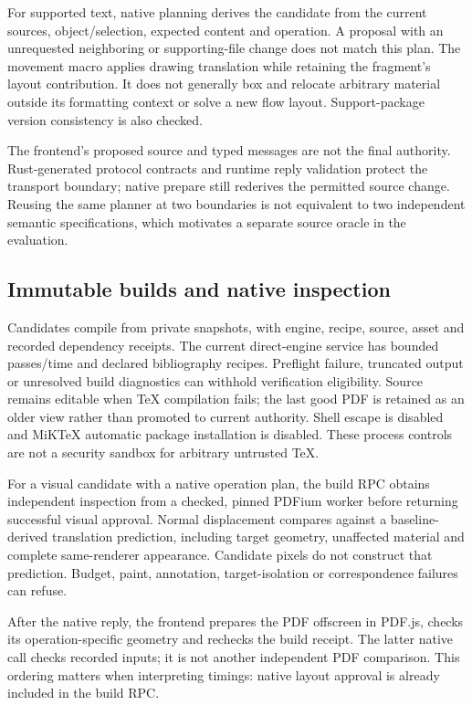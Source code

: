 For supported text, native planning derives the candidate from the current
sources, object/selection, expected content and operation. A proposal with an
unrequested neighboring or supporting-file change does not match this plan.
The movement macro applies drawing translation while retaining the fragment's
layout contribution. It does not generally box and relocate arbitrary material
outside its formatting context or solve a new flow layout. Support-package
version consistency is also checked.

The frontend's proposed source and typed messages are not the final authority.
Rust-generated protocol contracts and runtime reply validation protect the
transport boundary; native prepare still rederives the permitted source
change. Reusing the same planner at two boundaries is not equivalent to two
independent semantic specifications, which motivates a separate source oracle
in the evaluation.

\subsection{Immutable builds and native inspection}
Candidates compile from private snapshots, with engine, recipe, source,
asset and recorded dependency receipts. The current direct-engine service
has bounded passes/time and declared bibliography recipes. Preflight failure,
truncated output or unresolved build diagnostics can withhold verification
eligibility. Source remains editable when TeX compilation fails; the last
good PDF is retained as an older view rather than promoted to current authority.
Shell escape is disabled and MiKTeX automatic package installation is disabled.
These process controls are not a security sandbox for arbitrary untrusted TeX.

For a visual candidate with a native operation plan, the build RPC obtains independent inspection
from a checked, pinned PDFium worker before returning successful visual
approval. Normal displacement compares against a baseline-derived translation
prediction, including target geometry, unaffected material and complete
same-renderer appearance. Candidate pixels do not construct that prediction.
Budget, paint, annotation, target-isolation or correspondence failures can refuse.

After the native reply, the frontend prepares the PDF offscreen in PDF.js,
checks its operation-specific geometry and rechecks the build receipt.
The latter native  call checks recorded inputs; it is not
another independent PDF comparison. This ordering matters when interpreting
timings: native layout approval is already included in the build RPC.

